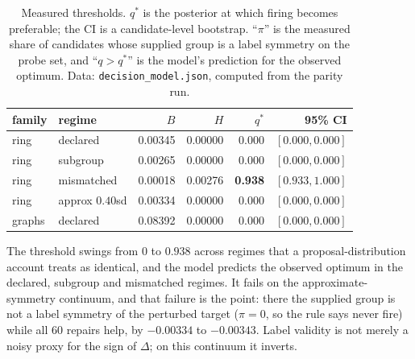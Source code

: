 \documentclass{neurips_2024}
\begin{document}
\begin{table}[t]
\caption{Measured thresholds. $q^*$ is the posterior at which firing becomes preferable; the CI is
a candidate-level bootstrap. ``$\pi$'' is the measured share of candidates whose supplied group is
a label symmetry on the probe set, and ``$q>q^*$'' is the model's prediction for the observed
optimum. Data: \texttt{decision\_model.json}, computed from the parity run.}
\label{tab:qstar}
\small
\begin{tabular}{@{}llrrrr@{}}
\toprule
family & regime & $B$ & $H$ & $q^*$ & 95\% CI \\
\midrule
ring & declared & 0.00345 & 0.00000 & 0.000 & $[0.000, 0.000]$ \\
ring & subgroup & 0.00265 & 0.00000 & 0.000 & $[0.000, 0.000]$ \\
ring & mismatched & 0.00018 & 0.00276 & \textbf{0.938} & $[0.933, 1.000]$ \\
ring & approx $0.40$sd & 0.00334 & 0.00000 & 0.000 & $[0.000, 0.000]$ \\
graphs & declared & 0.08392 & 0.00000 & 0.000 & $[0.000, 0.000]$ \\
\bottomrule
\end{tabular}
\end{table}

The threshold swings from $0$ to $0.938$ across regimes that a proposal-distribution account treats
as identical, and the model predicts the observed optimum in the declared, subgroup and mismatched
regimes. It fails on the approximate-symmetry continuum, and that failure is the point: there the
supplied group is not a label symmetry of the perturbed target ($\pi = 0$, so the rule says never
fire) while all $60$ repairs help, by $-0.00334$ to $-0.00343$. Label validity is not merely a noisy
proxy for the sign of $\Delta$; on this continuum it inverts.
\end{document}
